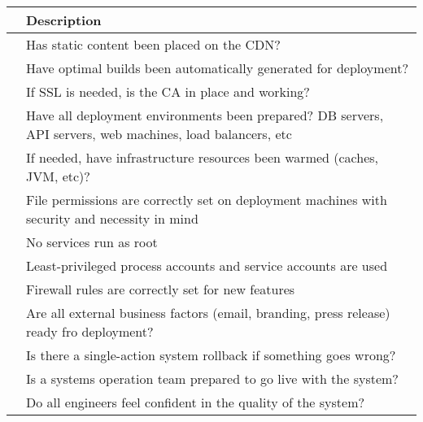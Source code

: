\documentclass{article}
\begin{document}
\begin{center}
    \begin{tabular}{ | p{.25cm} || p{10cm} |}
    \hline
     & Description \\ \hline
     & Has static content been placed on the CDN? \\ \hline
     & Have optimal builds been automatically generated for deployment? \\ \hline
     & If SSL is needed, is the CA in place and working? \\ \hline
     & Have all deployment environments been prepared? DB servers, API servers, web machines, load balancers, etc \\ \hline
     & If needed, have infrastructure resources been warmed (caches, JVM, etc)? \\ \hline
     & File permissions are correctly set on deployment machines with security and necessity in mind \\ \hline
     & No services run as root \\ \hline
     & Least-privileged process accounts and service accounts are used \\ \hline
     & Firewall rules are correctly set for new features \\ \hline
     & Are all external business factors (email, branding, press release) ready fro deployment? \\ \hline
     & Is there a single-action system rollback if something goes wrong? \\ \hline
     & Is a systems operation team prepared to go live with the system? \\ \hline
     & Do all engineers feel confident in the quality of the system? \\ \hline
    \end{tabular}
\end{center}
\end{document}
